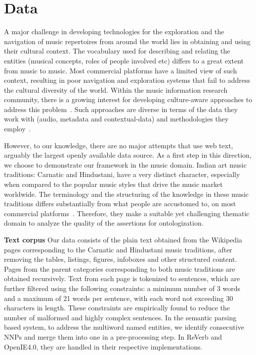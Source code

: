 \documentclass{llncs}
\begin{document}
\section{Data}
\label{sec:data}
A major challenge in developing technologies for the exploration and the navigation of music repertoires from around the world lies in obtaining and using their cultural context. The vocabulary used for describing and relating the entities (musical concepts, roles of people involved etc) differs to a great extent from music to music. Most commercial platforms have a limited view of such context, resulting in poor navigation and exploration systems that fail to address the cultural diversity of the world.  Within the music information research community, there is a growing interest for developing culture-aware approaches to address this problem~\cite{Serra2011}. Such approaches are diverse in terms of the data they work with (audio, metadata and contextual-data) and methodologies they employ~\cite{Serra2013a}. 

However, to our knowledge, there are no major attempts that use web text, arguably the largest openly available data source. As a first step in this direction, we choose to demonstrate our framework in the music domain. Indian art music traditions: Carnatic and Hindustani, have a very distinct character, especially when compared to the popular music styles that drive the music market worldwide. The terminology and the structuring of the knowledge in these music traditions differs substantially from what people are accustomed to, on most commercial platforms~\cite{Krishna2012}. Therefore, they make a suitable yet challenging thematic domain to analyze the quality of the assertions for ontologization.

\medskip
\noindent
\textbf{Text corpus} Our data consists of the plain text obtained from the Wikipedia pages corresponding to the Carnatic and Hindustani music traditions, after removing the tables, listings, figures, infoboxes and other structured content. Pages from the parent categories corresponding to both music traditions are obtained recursively. Text from each page is tokenized to sentences, which are further filtered using the following constraints: a minimum number of 3 words and a maximum of 21 words per sentence, with each word not exceeding 30 characters in length. These constraints are empirically found to reduce the number of malformed and highly complex sentences. In the semantic parsing based system, to address the multiword named entities, we identify consecutive NNPs and merge them into one in a pre-processing step. In ReVerb and OpenIE4.0, they are handled in their respective implementations.
\end{document}
